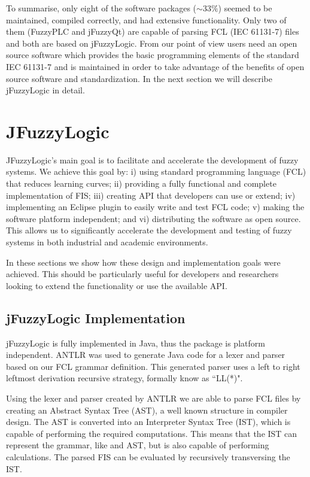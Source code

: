 \documentclass[11pt,twoside]{article}
\begin{document}
\begin{multicols}{2}
\begin{itemize}
\end{itemize}
To summarise, only eight of the software packages ($\sim 33\%$) seemed to be maintained, compiled correctly, and had extensive functionality.  Only two of them (FuzzyPLC and jFuzzyQt) are capable of parsing FCL (IEC 61131-7) files and both are based on jFuzzyLogic. From our point of view users need an open source software which provides the basic programming elements of the standard IEC 61131-7 and is maintained in order to take advantage of the benefits of open source software and standardization. In the next section
we will describe jFuzzyLogic in detail.


\section{JFuzzyLogic \label{sec:jFu}}

JFuzzyLogic's  main goal is to facilitate and accelerate the development of fuzzy systems. We achieve this goal by: i) using standard programming language (FCL) that reduces learning curves; ii) providing a fully functional and complete implementation of FIS; iii) creating API that developers can use or extend; iv) implementing an Eclipse plugin to easily write and test FCL code; v) making the software platform independent; and vi) distributing the software as open source. This allows us to significantly accelerate the development and testing of fuzzy systems in both industrial and academic environments.

In these sections we show how these design and implementation goals were achieved. This should be particularly useful for developers and researchers looking to extend the functionality or use the available API.


\subsection{jFuzzyLogic Implementation \label{sec:implement}}

jFuzzyLogic is fully implemented in Java, thus the package is platform independent. ANTLR\cite{parr2007definitive} was used to generate Java code for a lexer and parser based on our FCL grammar definition. This generated parser uses a left to right leftmost derivation recursive strategy, formally know as ``LL(*)".

Using the lexer and parser created by ANTLR we are able to parse FCL files by creating an Abstract Syntax Tree (AST), a well known structure in compiler design. The AST is converted into an Interpreter Syntax Tree (IST), which is capable of performing the required computations. This means that the IST can represent the grammar, like and AST, but is also capable of performing calculations. The parsed FIS can be evaluated by recursively transversing the IST.



\end{multicols}
\end{document}
